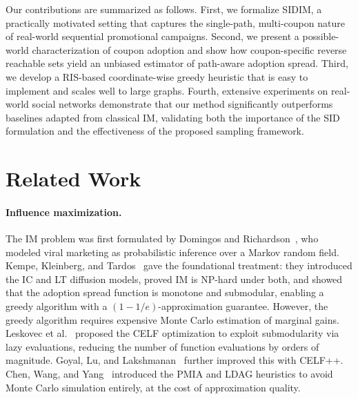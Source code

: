 \documentclass[sigconf]{acmart}
\begin{document}
Our contributions are summarized as follows. First, we formalize SIDIM, a practically motivated setting that captures the single-path, multi-coupon nature of real-world sequential promotional campaigns. Second, we present a possible-world characterization of coupon adoption and show how coupon-specific reverse reachable sets yield an unbiased estimator of path-aware adoption spread. Third, we develop a RIS-based coordinate-wise greedy heuristic that is easy to implement and scales well to large graphs. Fourth, extensive experiments on real-world social networks demonstrate that our method significantly outperforms baselines adapted from classical IM, validating both the importance of the SID formulation and the effectiveness of the proposed sampling framework.


\section{Related Work}

\paragraph{Influence maximization.}
The IM problem was first formulated by Domingos and Richardson~\cite{domingos2001mining,richardson2002mining}, who modeled viral marketing as probabilistic inference over a Markov random field. Kempe, Kleinberg, and Tardos~\cite{kempe2003maximizing} gave the foundational treatment: they introduced the IC and LT diffusion models, proved IM is NP-hard under both, and showed that the adoption spread function is monotone and submodular, enabling a greedy algorithm with a $(1-1/e)$-approximation guarantee. However, the greedy algorithm requires expensive Monte Carlo estimation of marginal gains. Leskovec et al.~\cite{leskovec2007celf} proposed the CELF optimization to exploit submodularity via lazy evaluations, reducing the number of function evaluations by orders of magnitude. Goyal, Lu, and Lakshmanan~\cite{goyal2011celf} further improved this with CELF++. Chen, Wang, and Yang~\cite{chen2009efficient} introduced the PMIA and LDAG heuristics to avoid Monte Carlo simulation entirely, at the cost of approximation quality.
\end{document}

